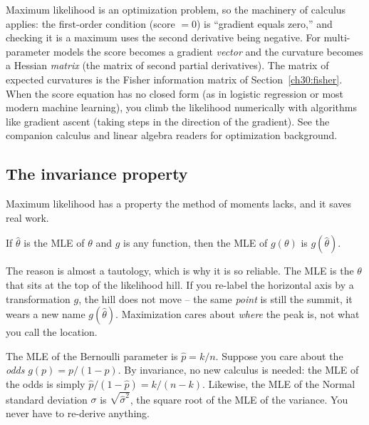 \begin{connectionbox}
Maximum likelihood is an optimization problem, so the machinery of
calculus applies: the first-order condition (score $=0$) is
``gradient equals zero,'' and checking it is a maximum uses the second
derivative being negative. For multi-parameter models the score becomes a
gradient \emph{vector} and the curvature becomes a Hessian \emph{matrix} (the matrix of second partial derivatives). The matrix of expected curvatures is the Fisher
information matrix of Section~\ref{ch30:fisher}. When the score equation has no
closed form (as in logistic regression or most modern machine learning),
you climb the likelihood numerically with algorithms like gradient ascent (taking steps in the direction of the gradient). See the companion
calculus and linear algebra readers for optimization background.
\end{connectionbox}

\subsection{The invariance property}
\label{ch30:invariance}

Maximum likelihood has a property the method of moments lacks, and it saves real
work.

\begin{theorem}
\label{ch30:thm-invariance}
If $\hat\theta$ is the MLE of $\theta$ and $g$ is any function, then the MLE of
$g(\theta)$ is $g(\hat\theta)$.
\end{theorem}

\begin{whybox}
The reason is almost a tautology, which is why it is so reliable. The MLE is the
$\theta$ that sits at the top of the likelihood hill. If you re-label the
horizontal axis by a transformation $g$, the hill does not move -- the same
\emph{point} is still the summit, it wears a new name $g(\hat\theta)$.
Maximization cares about \emph{where} the peak is, not what you call the
location.
\end{whybox}

\begin{example}
\label{ch30:ex-invariance}
The MLE of the Bernoulli parameter is $\hat p = k/n$. Suppose you care
about the \emph{odds} $g(p)=p/(1-p)$. By invariance, no new calculus is needed:
the MLE of the odds is simply $\hat p/(1-\hat p) = k/(n-k)$. Likewise, the MLE
of the Normal standard deviation $\sigma$ is $\sqrt{\hat\sigma^2}$, the square
root of the MLE of the variance. You never have to re-derive anything.
\end{example}


